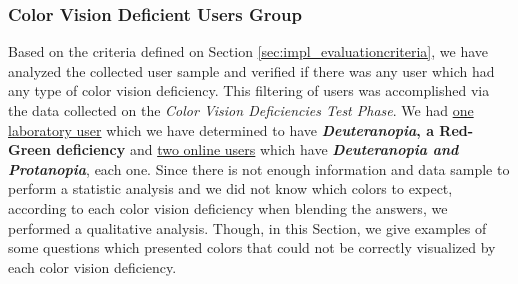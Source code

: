 \subsubsection{Color Vision Deficient Users Group}
\label{subsubsec:demo_daltonic}
%
Based on the criteria defined on Section \ref{sec:impl_evaluationcriteria}, we have analyzed the collected user sample and verified if there was any user which had any type of color vision deficiency. This filtering of users was accomplished via the data collected on the \emph{Color Vision Deficiencies Test
Phase}. We had \ul{one laboratory user} which we have determined to have \textbf{\emph{Deuteranopia}, a Red-Green deficiency} and \ul{two online users} which have \textbf{\emph{Deuteranopia and Protanopia}}, each one. Since there is not enough information and data sample to perform a statistic analysis and we
did not know which colors to expect, according to each color vision deficiency when blending the answers, we performed a qualitative analysis. Though, in this Section, we give examples of some questions which presented colors that could not be correctly visualized by each color vision deficiency. \par
%
